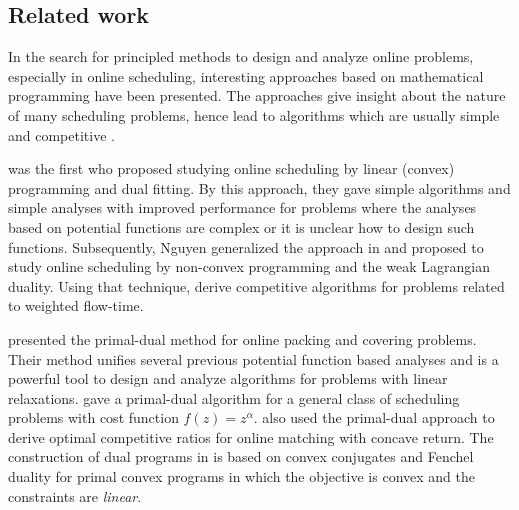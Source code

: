 \documentclass[11pt]{article}
\begin{document}
\subsection{Related work}



In the search for principled methods to design and analyze online problems,
especially in online scheduling, interesting approaches 
\cite{AnandGarg12:Resource-augmentation,GuptaKrishnaswamy12:Online-Primal-Dual,Thang13:Lagrangian-Duality} 
based on mathematical programming have been presented. 
The approaches give insight about the nature of many scheduling problems,
hence lead to algorithms which are usually simple and competitive
\cite{AnandGarg12:Resource-augmentation,GuptaKrishnaswamy12:Online-Primal-Dual,Thang13:Lagrangian-Duality,DevanurHuang14:Primal-Dual,ImKulkarni14:Competitive-Algorithms,ImKulkarni14:SELFISHMIGRATE:-A-Scalable}.

\citet{AnandGarg12:Resource-augmentation} was the first who proposed 
studying online scheduling by linear (convex) 
programming and dual fitting. By this approach, they gave 
simple algorithms and simple analyses with improved performance
for problems where the analyses based on potential functions are complex or 
it is unclear how to design such functions. Subsequently, 
Nguyen \cite{Thang13:Lagrangian-Duality} generalized the approach
in \cite{AnandGarg12:Resource-augmentation} and proposed to study online scheduling 
by non-convex programming and the weak Lagrangian duality. Using that technique,
\cite{Thang13:Lagrangian-Duality} derive competitive algorithms 
for problems related to weighted flow-time.

\citet{BuchbinderNaor09:The-Design-of-Competitive}
presented the primal-dual method for online packing and covering problems.
Their method unifies several previous
potential function based analyses and is a powerful tool to design and analyze 
algorithms for problems with linear relaxations.
\citet{GuptaKrishnaswamy12:Online-Primal-Dual}
gave a primal-dual algorithm for a general class of scheduling problems with 
cost function $f(z) = z^{\alpha}$. \citet{DevanurJain12:Online-matching}
also used the primal-dual approach to derive optimal competitive ratios for online
matching with concave return. 
The construction of dual programs in \cite{DevanurHuang14:Primal-Dual,DevanurJain12:Online-matching}
is based on convex conjugates and Fenchel duality for primal convex programs
in which the objective is convex and the constraints are \emph{linear}. 
\end{document}
